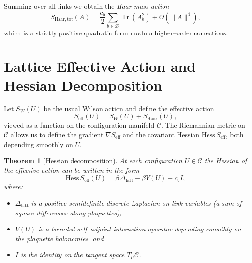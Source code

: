 \documentclass[11pt]{article}
\newtheorem{theorem}{Theorem}[section]
\begin{document}
Summing over all links we obtain the \emph{Haar mass action}
\begin{equation}
  S_{\mathrm{Haar,tot}}(A)
  = \frac{c_0}{2}\sum_{b\in\mathcal{B}}\operatorname{Tr}(A_b^2)
    + O(\|A\|^4),
\end{equation}
which is a strictly positive quadratic form modulo higher--order
corrections.

\section{Lattice Effective Action and Hessian Decomposition}

Let $S_W(U)$ be the usual Wilson action and define the effective action
\begin{equation}
  S_{\mathrm{eff}}(U)
  = S_W(U) + S_{\mathrm{Haar}}(U),
\end{equation}
viewed as a function on the configuration manifold $\mathcal{C}$.  The
Riemannian metric on $\mathcal{C}$ allows us to define the gradient
$\nabla S_{\mathrm{eff}}$ and the covariant Hessian
$\mathrm{Hess}\,S_{\mathrm{eff}}$, both depending smoothly on $U$.

\begin{theorem}[Hessian decomposition]
\label{thm:Hess-decomp}
At each configuration $U\in\mathcal{C}$ the Hessian of the effective
action can be written in the form
\begin{equation}
  \mathrm{Hess}\,S_{\mathrm{eff}}(U)
  = \beta\,\Delta_{\mathrm{latt}} - \beta V(U) + c_0 I,
\end{equation}
where:
\begin{itemize}
\item $\Delta_{\mathrm{latt}}$ is a positive semidefinite discrete
  Laplacian on link variables (a sum of square differences along
  plaquettes),
\item $V(U)$ is a bounded self--adjoint interaction operator depending
  smoothly on the plaquette holonomies, and
\item $I$ is the identity on the tangent space $T_U\mathcal{C}$.
\end{itemize}
\end{theorem}
\end{document}
